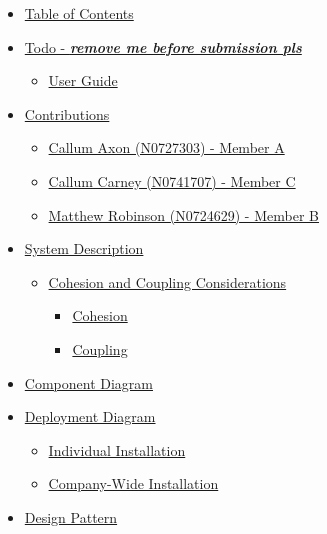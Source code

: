 \documentclass[
  english,
  a4paper,
,tablecaptionabove
]{scrartcl}
\providecommand{\tightlist}{%
  \setlength{\itemsep}{0pt}\setlength{\parskip}{0pt}}
\begin{document}
\begin{itemize}
\tightlist
\item
  \protect\hyperlink{table-of-contents}{Table of Contents}
\item
  \protect\hyperlink{todo---remove-me-before-submission-pls}{Todo -
  \textbf{\emph{remove me before submission pls}}}

  \begin{itemize}
  \tightlist
  \item
    \protect\hyperlink{user-guide}{User Guide}
  \end{itemize}
\item
  \protect\hyperlink{contributions}{Contributions}

  \begin{itemize}
  \tightlist
  \item
    \protect\hyperlink{callum-axon-n0727303---member-a}{Callum Axon
    (N0727303) - Member A}
  \item
    \protect\hyperlink{callum-carney-n0741707---member-c}{Callum Carney
    (N0741707) - Member C}
  \item
    \protect\hyperlink{matthew-robinson-n0724629---member-b}{Matthew
    Robinson (N0724629) - Member B}
  \end{itemize}
\item
  \protect\hyperlink{system-description}{System Description}

  \begin{itemize}
  \tightlist
  \item
    \protect\hyperlink{cohesion-and-coupling-considerations}{Cohesion
    and Coupling Considerations}

    \begin{itemize}
    \tightlist
    \item
      \protect\hyperlink{cohesion}{Cohesion}
    \item
      \protect\hyperlink{coupling}{Coupling}
    \end{itemize}
  \end{itemize}
\item
  \protect\hyperlink{component-diagram}{Component Diagram}
\item
  \protect\hyperlink{deployment-diagram}{Deployment Diagram}

  \begin{itemize}
  \tightlist
  \item
    \protect\hyperlink{individual-installation}{Individual Installation}
  \item
    \protect\hyperlink{company-wide-installation}{Company-Wide
    Installation}
  \end{itemize}
\item
  \protect\hyperlink{design-pattern}{Design Pattern}


\end{itemize}
\end{document}
